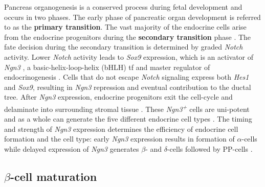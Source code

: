 Pancreas organogenesis is a conserved process during fetal development and occurs in two phases. The early phase of pancreatic organ development is referred to as the \textbf{primary transition}. The vast majority of the endocrine cells arise from the endocrine progenitors during the \textbf{secondary transition} phase \textbf{\cite{pan_pancreas_2011}}. %
The fate decision during the secondary transition is determined by graded \textit{Notch} activity. Lower \textit{Notch} activity leads to \textit{Sox9} expression, which is an activator of \textit{Ngn3} \textbf{\cite{shih_pancreas_2013}}, a basic-helix-loop-helix (bHLH) \gls{tf} and master regulator of endocrinogenesis \textbf{\cite{gu_direct_2002}}. Cells that do not escape \textit{Notch} signaling express both \textit{Hes1} and \textit{Sox9}, resulting in \textit{Ngn3} repression and eventual contribution to the ductal tree. %
After \textit{Ngn3} expression, endocrine progenitors exit the cell-cycle and delaminate into surrounding stromal tissue \textbf{\cite{shih_pancreas_2013, gouzi_neurogenin3_2011, miyatsuka_neurogenin3_2011}}. These \textit{Ngn3\textsuperscript{+}} cells are uni-potent and as a whole can generate the five different endocrine cell types \textbf{\cite{shih_pancreas_2013,gu_direct_2002,miyatsuka_neurogenin3_2011}}. The timing and strength of \textit{Ngn3} expression determines the efficiency of endocrine cell formation and the cell type: early \textit{Ngn3} expression results in formation of $\alpha$-cells while delayed expression of \textit{Ngn3}  generates $\beta$- and $\delta$-cells followed by PP-cells \textbf{\cite{johansson_temporal_2007}}.



\subsection{$\beta$-cell maturation} %
\label{sec:betamat}

